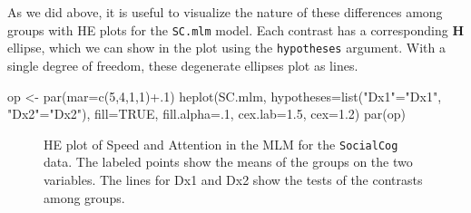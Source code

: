 \documentclass[
  letterpaper,
  10pt,
  krantz2]{krantz}
\makeatletter
\newenvironment{Shaded}{\begin{snugshade}}{\end{snugshade}}
\newcommand{\AttributeTok}[1]{\textcolor[rgb]{0.40,0.45,0.13}{#1}}
\newcommand{\ConstantTok}[1]{\textcolor[rgb]{0.56,0.35,0.01}{#1}}
\newcommand{\DecValTok}[1]{\textcolor[rgb]{0.68,0.00,0.00}{#1}}
\newcommand{\FloatTok}[1]{\textcolor[rgb]{0.68,0.00,0.00}{#1}}
\newcommand{\FunctionTok}[1]{\textcolor[rgb]{0.28,0.35,0.67}{#1}}
\newcommand{\NormalTok}[1]{\textcolor[rgb]{0.00,0.23,0.31}{#1}}
\newcommand{\OtherTok}[1]{\textcolor[rgb]{0.00,0.23,0.31}{#1}}
\newcommand{\SpecialCharTok}[1]{\textcolor[rgb]{0.37,0.37,0.37}{#1}}
\newcommand{\StringTok}[1]{\textcolor[rgb]{0.13,0.47,0.30}{#1}}
\newenvironment{kframe}{%
  \medskip{}
  \setlength{\fboxsep}{.8em}
  \def\at@end@of@kframe{}%
  \ifinner\ifhmode%
  \def\at@end@of@kframe{\end{minipage}}%
  \begin{minipage}{\columnwidth}%
  \fi\fi%
  \def\FrameCommand##1{\hskip\@totalleftmargin \hskip-\fboxsep
  \colorbox{shadecolor}{##1}\hskip-\fboxsep
      \hskip-\linewidth \hskip-\@totalleftmargin \hskip\columnwidth}%
  \MakeFramed {\advance\hsize-\width
    \@totalleftmargin\z@ \linewidth\hsize
    \@setminipage}}%
{\par\unskip\endMakeFramed%
  \at@end@of@kframe}
\renewenvironment{Shaded}{\begin{kframe}}{\end{kframe}}
\makeatother
\begin{document}
As we did above, it is useful to visualize the nature of these
differences among groups with HE plots for the \texttt{SC.mlm} model.
Each contrast has a corresponding \(\mathbf{H}\) ellipse, which we can
show in the plot using the \texttt{hypotheses} argument. With a single
degree of freedom, these degenerate ellipses plot as lines.

\begin{Shaded}
\begin{Highlighting}[]
\NormalTok{op }\OtherTok{\textless{}{-}} \FunctionTok{par}\NormalTok{(}\AttributeTok{mar=}\FunctionTok{c}\NormalTok{(}\DecValTok{5}\NormalTok{,}\DecValTok{4}\NormalTok{,}\DecValTok{1}\NormalTok{,}\DecValTok{1}\NormalTok{)}\SpecialCharTok{+}\NormalTok{.}\DecValTok{1}\NormalTok{)}
\FunctionTok{heplot}\NormalTok{(SC.mlm, }
       \AttributeTok{hypotheses=}\FunctionTok{list}\NormalTok{(}\StringTok{"Dx1"}\OtherTok{=}\StringTok{"Dx1"}\NormalTok{, }\StringTok{"Dx2"}\OtherTok{=}\StringTok{"Dx2"}\NormalTok{),}
       \AttributeTok{fill=}\ConstantTok{TRUE}\NormalTok{, }\AttributeTok{fill.alpha=}\NormalTok{.}\DecValTok{1}\NormalTok{,}
       \AttributeTok{cex.lab=}\FloatTok{1.5}\NormalTok{, }\AttributeTok{cex=}\FloatTok{1.2}\NormalTok{)}
\FunctionTok{par}\NormalTok{(op)}
\end{Highlighting}
\end{Shaded}

\begin{figure}[H]


\caption{\label{fig-SC-HEplot}HE plot of Speed and Attention in the MLM
for the \texttt{SocialCog} data. The labeled points show the means of
the groups on the two variables. The lines for Dx1 and Dx2 show the
tests of the contrasts among groups.}

\end{figure}%
\end{document}
